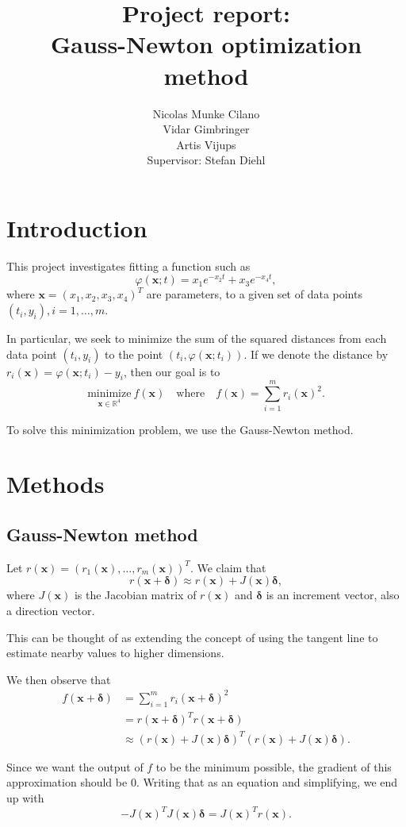 \documentclass[12pt, a4paper]{article}
\title{Project report:
\\ Gauss-Newton optimization method}
\author{Nicolas Munke Cilano
\\ Vidar Gimbringer 
\\ Artis Vijups 
\vspace{20pt} \\ Supervisor: Stefan Diehl}
\newcommand{\bx}{\boldsymbol{x}}
\newcommand{\bd}{\boldsymbol{\delta}}
\begin{document}
\maketitle

\section{Introduction}

This project investigates fitting a function such as \[\varphi(\bx; t)=x_1e^{-x_2t}+x_3e^{-x_4t},\] where $\bx={(x_1,x_2,x_3,x_4)}^{T}$ are parameters, to a given set of data points $(t_i,y_i), i=1,\ldots,m$.

In particular, we seek to minimize the sum of the squared distances from each data point $(t_i,y_i)$ to the point $(t_i,\varphi(\bx; t_i))$. If we denote the distance by $r_i(\bx)=\varphi(\bx; t_i)-y_i$, then our goal is to \[\underset{\bx\in\mathbb{R}^4}{\text{minimize}}~f(\bx)\quad\text{where}\quad f(\bx)=\sum_{i=1}^{m}{r_i(\bx)}^2.\]

To solve this minimization problem, we use the Gauss-Newton method.

\section{Methods}

\subsection{Gauss-Newton method}

Let $r(\bx)={(r_1(\bx),\ldots,r_m(\bx))}^T$. We claim that \[r(\bx+\bd)\approx r(\bx)+J(\bx)\bd,\]where $J(\bx)$ is the Jacobian matrix of $r(\bx)$ and $\bd$ is an increment vector, also a direction vector.

This can be thought of as extending the concept of using the tangent line to estimate nearby values to higher dimensions.

We then observe that \begin{align*}
f(\bx+\bd) &= \sum_{i=1}^{m}{r_i(\bx+\bd)}^2 \\ 
&= {r(\bx+\bd)}^T r(\bx+\bd) \\
&\approx {(r(\bx)+J(\bx)\bd)}^T (r(\bx)+J(\bx)\bd).
\end{align*}

Since we want the output of $f $ to be the minimum possible, the gradient of this approximation should be $0$. Writing that as an equation and simplifying, we end up with \[-{J(\bx)}^T J(\bx)\bd={J(\bx)}^T r(\bx).\]
\end{document}

